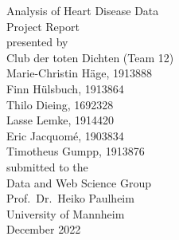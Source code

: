 \documentclass[11pt,titlepage,oneside,openany]{book}
\begin{document}
\begin{titlepage}
	\vspace*{2cm}
  \begin{center}
   {\Large Analysis of Heart Disease Data\\}
   \vspace{2cm} 
   {Project Report\\}
   \vspace{2cm}
   {presented by\\
   	Club der toten Dichten (Team 12)\\
    Marie-Christin Häge, 1913888 \\
    Finn Hülsbuch, 1913864 \\
    Thilo Dieing, 1692328 \\
    Lasse Lemke, 1914420 \\
    Eric Jacquomé, 1903834 \\
    Timotheus Gumpp, 1913876 \\
   }
   \vspace{1cm} 
   {submitted to the\\
    Data and Web Science Group\\
    Prof.\ Dr.\ Heiko Paulheim\\
    University of Mannheim\\} \vspace{2cm}
   {December 2022}
  \end{center}
\end{titlepage} 






\newpage











\vspace{2cm}
\begin{small}
  \printbibliography
\end{small}

\pagestyle{plain}
\end{document}
